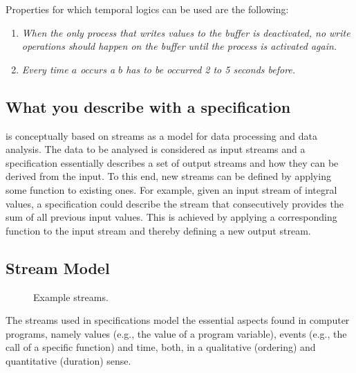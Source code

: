 Properties for which temporal logics can be used are the following:

\begin{enumerate}
	\item \textit{When the only process that writes values to the buffer is deactivated, no write operations should happen on the buffer until the process is activated again.}
	\item \textit{Every time $a$ occurs a $b$ has to be occurred 2 to 5 seconds before.}
\end{enumerate}

\subsection{What you describe with a \tessla specification}

\tessla is conceptually based on streams as a model for data processing and data analysis.
The data to be analysed is considered as input streams and a \tessla specification essentially describes a set of output streams and how they can be derived from the input.
To this end, new streams can be defined by applying some function to existing ones.
For example, given an input stream of integral values, a \tessla specification could describe the stream that consecutively provides the sum of all previous input values.
This is achieved by applying a corresponding function to the input stream and thereby defining a new output stream.

\subsection{Stream Model}
\label{sec:streams}

\begin{figure}
  
  \caption{Example streams.\label{fig:streams}}
\end{figure}

The streams used in \tessla specifications model the essential aspects found in computer programs, namely values (e.g., the value of a program variable), events (e.g., the call of a specific function) and time, both, in a qualitative (ordering) and quantitative (duration) sense.

